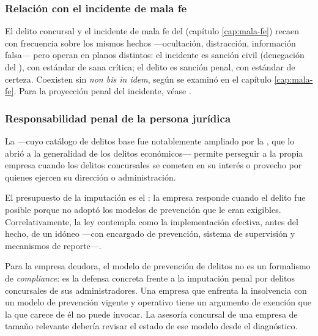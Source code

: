 \subsubsection{Relación con el incidente de mala fe}

El delito concursal y el incidente de mala fe del  (capítulo \ref{cap:mala-fe})
recaen con frecuencia sobre los mismos hechos ---ocultación, distracción, información falsa---
pero operan en planos distintos: el incidente es sanción civil (denegación del
\discharge{}), con estándar de sana crítica; el delito es sanción penal, con estándar de
certeza. Coexisten sin \emph{non bis in idem}, según se examinó en el capítulo
\ref{cap:mala-fe}. Para la proyección penal del incidente, véase
\textcite{doc-mala-fe-penal}.

\subsubsection{Responsabilidad penal de la persona jurídica}

La \Lrpj{} \citeyearpar{ley-20393} ---cuyo catálogo de delitos base fue notablemente ampliado por
la \Ldeleco{}, que lo abrió a la generalidad de los delitos económicos--- permite perseguir a la
propia empresa cuando los delitos concursales se cometen en su interés o provecho por quienes
ejercen su dirección o administración.

El presupuesto de la imputación es el : la empresa responde
cuando el delito fue posible porque no adoptó los modelos de prevención que le eran exigibles.
Correlativamente, la ley contempla como  la implementación
efectiva, antes del hecho, de un  idóneo ---con
encargado de prevención, sistema de supervisión y mecanismos de reporte---.

\begin{foco}
Para la empresa deudora, el modelo de prevención de delitos no es un formalismo de
\emph{compliance}: es la defensa concreta frente a la imputación penal por delitos concursales de
sus administradores. Una empresa que enfrenta la insolvencia con un modelo de prevención vigente
y operativo tiene un argumento de exención que la que carece de él no puede invocar. La asesoría
concursal de una empresa de tamaño relevante debería revisar el estado de ese modelo desde el
diagnóstico.
\end{foco}

